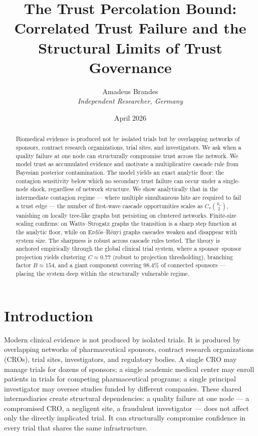 \documentclass[11pt,a4paper]{article}
\title{The Trust Percolation Bound: Correlated Trust Failure and the Structural Limits of Trust Governance}
\author{Amadeus Brandes\\
\textit{Independent Researcher, Germany}}
\date{April 2026}
\begin{document}
\maketitle

\begin{abstract}
Biomedical evidence is produced not by isolated trials but by overlapping networks of sponsors, contract research organizations, trial sites, and investigators. We ask when a quality failure at one node can structurally compromise trust across the network. We model trust as accumulated evidence and motivate a multiplicative cascade rule from Bayesian posterior contamination. The model yields an exact analytic floor: the contagion sensitivity below which no secondary trust failure can occur under a single-node shock, regardless of network structure. We show analytically that in the intermediate contagion regime --- where multiple simultaneous hits are required to fail a trust edge --- the number of first-wave cascade opportunities scales as $C_v \binom{k_v}{2}$, vanishing on locally tree-like graphs but persisting on clustered networks. Finite-size scaling confirms: on Watts--Strogatz graphs the transition is a sharp step function at the analytic floor, while on Erd\H{o}s--R\'enyi graphs cascades weaken and disappear with system size. The sharpness is robust across cascade rules tested. The theory is anchored empirically through the global clinical trial system, where a sponsor--sponsor projection yields clustering $C \approx 0.77$ (robust to projection thresholding), branching factor $B \approx 154$, and a giant component covering 98.4\% of connected sponsors --- placing the system deep within the structurally vulnerable regime.
\end{abstract}



\section{Introduction}

Modern clinical evidence is not produced by isolated trials. It is produced by overlapping networks of pharmaceutical sponsors, contract research organizations (CROs), trial sites, investigators, and regulatory bodies. A single CRO may manage trials for dozens of sponsors; a single academic medical center may enroll patients in trials for competing pharmaceutical programs; a single principal investigator may oversee studies funded by different companies. These shared intermediaries create structural dependencies: a quality failure at one node --- a compromised CRO, a negligent site, a fraudulent investigator --- does not affect only the directly implicated trial. It can structurally compromise confidence in every trial that shares the same infrastructure.
\end{document}
